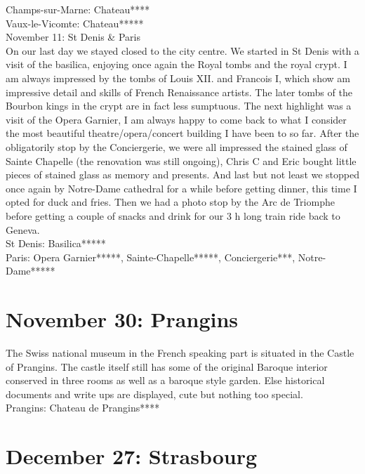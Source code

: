 Champs-sur-Marne: Chateau****\\
Vaux-le-Vicomte: Chateau*****\\

November 11: St Denis \& Paris\\
On our last day we stayed closed to the city centre. We started in St Denis with a visit of the basilica, enjoying once again the Royal tombs and the royal crypt. I am always impressed by the tombs of Louis XII. and Francois I, which show am impressive detail and skills of French Renaissance artists. The later tombs of the Bourbon kings in the crypt are in fact less sumptuous. The next highlight was a visit of the Opera Garnier, I am always happy to come back to what I consider the most beautiful theatre/opera/concert building I have been to so far. After the obligatorily stop by the Conciergerie, we were all impressed the stained glass of Sainte Chapelle (the renovation was still ongoing), Chris C and Eric bought little pieces of stained glass as memory and presents. And last but not least we stopped once again by Notre-Dame cathedral for a while before getting dinner, this time I opted for duck and fries. Then we had a photo stop by the Arc de Triomphe before getting a couple of snacks and drink for our 3 h long train ride back to Geneva.\\

St Denis: Basilica*****\\
Paris: Opera Garnier*****, Sainte-Chapelle*****, Conciergerie***, Notre-Dame*****

\section{November 30: Prangins}
\label{2013:Prangins}

The Swiss national museum in the French speaking part is situated in the Castle of Prangins. The castle itself still has some of the original Baroque interior conserved in three rooms as well as a baroque style garden. Else historical documents and write ups are displayed, cute but nothing too special.\\

Prangins: Chateau de Prangins****

\section{December 27: Strasbourg}
\label{2013Strasbourg}

